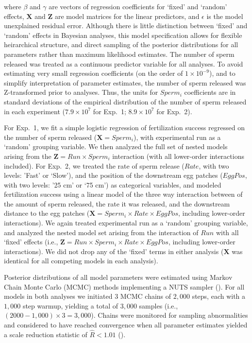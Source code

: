 \documentclass{article}
\begin{document}
	\noindent where $\beta$ and $\gamma$ are vectors of regression coefficients for `fixed' and `random' effects, $\mathbf{X}$ and $\mathbf{Z}$ are model matrices for the linear predictors, and $\epsilon$ is the model unexplained residual error. Although there is little distinction between `fixed' and `random' effects in Bayesian analyses, this model specification allows for flexible heirarchical structure, and direct sampling of the posterior distributions for all parameters rather than maximum likelihood estimates. The number of sperm released was treated as a continuous predictor variable for all analyses. To avoid estimating very small regression coefficients (on the order of $1 \times 10^{-9}$), and to simplify interpretation of parameter estimates, the number of sperm released was Z-transformed prior to analyses. Thus, the units for $Sperm_i$ coefficients are in standard deviations of the empirical distribution of the number of sperm released in each experiment ($7.9 \times 10^{7}$ for Exp.~1; $8.9 \times 10^{7}$ for Exp.~2). 

	For Exp.~1, we fit a simple logistic regression of fertilization success regressed on the number of sperm released ($\mathbf{X} = Sperm_i$), with experimental run as a `random' grouping variable. We then analyzed the full set of nested models arising from the $\mathbf{Z} = Run \times Sperm_i$ interaction (with all lower-order interactions included). For Exp.~2, we treated the rate of sperm release ($Rate$, with two levels: 'Fast' or `Slow'), and the position of the downstream egg patches ($EggPos$, with two levels: '25 cm' or `75 cm') as categorical variables, and modeled fertilization success using a linear model of the three way interaction between of the amount of sperm released, the rate it was released, and the downstream distance to the egg patches ($ \mathbf{X} = Sperm_i \times Rate \times EggPos$, including lower-order interactions). We again treated experimental run as a `random' grouping variable, and analyzed the nested model set arising from the interaction of $Run$ with all `fixed' effects (i.e., $\mathbf{Z} = Run \times Sperm_i \times Rate \times EggPos$, including lower-order interactions). We did not drop any of the `fixed' terms in either analysis ($\mathbf{X}$ was identical for all competing models in each analysis).

	Posterior distributions of all model parameters were estimated using Markov Chain Monte Carlo (MCMC) methods implementing a NUTS sampler (\citealt{Stan2016}). For all models in both analyses we initiated $3$ MCMC chains of $2,000$ steps, each with a $1,000$ step warmup, yielding a total of $3,000$ samples (i.e., $(2000 - 1,000) \times 3 = 3,000$). Chains were monitored for sampling abnormalities and considered to have reached convergence when all parameter estimates yielded a scale reduction statistic of $\hat{R} < 1.01$ (\citealt{GelmanRubin1992}).
\end{document}
